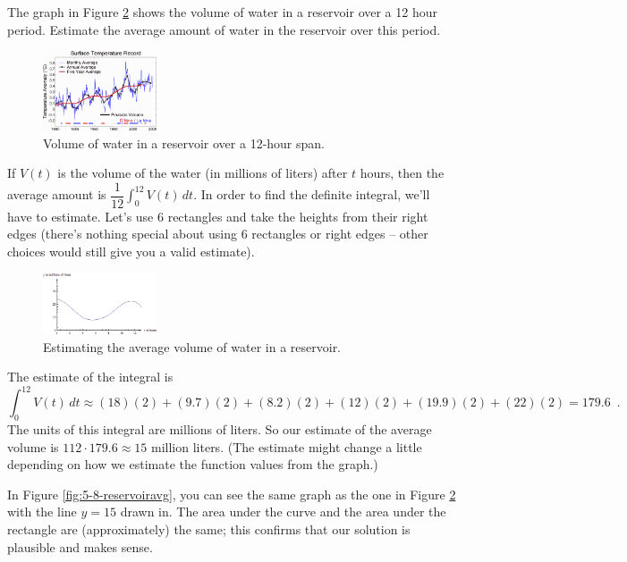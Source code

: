 \begin{example}
The graph in Figure \ref{fig:5-8-reservoir} shows the volume of water in a reservoir over a 12 hour period. Estimate the average amount of water in the reservoir over this period.

\begin{figure}[!ht]
  \centering
    \includegraphics[width=0.3\textwidth]{img/chap5/image054.png}
    \caption{Volume of water in a reservoir over a 12-hour span.}
    \label{fig:5-8-reservoir}
\end{figure}
\begin{solution}
If $V(t)$ is the volume of the water (in millions of liters) after $t$ hours, then the average amount is $\dfrac{1}{12}\int_0^{12}V(t)\,dt$. In order to find the definite integral, we'll have to estimate. Let's use 6 rectangles and take the heights from their right edges (there's nothing special about using 6 rectangles or right edges -- other choices would still give you a valid estimate).

\begin{figure}[!ht]
  \centering
    \includegraphics[width=0.3\textwidth]{img/chap5/image055.png}
    \caption{Estimating the average volume of water in a reservoir.}
    \label{fig:5-8-reservoir}
\end{figure}

The estimate of the integral is
$$\int_0^{12}V(t)\,dt\approx   (18)(2)+(9.7)(2)+(8.2)(2)+(12)(2)+(19.9)(2)+(22)(2)=179.6 \enspace .$$
The units of this integral are millions of liters. So our estimate of the average volume is $112\cdot 179.6 \approx 15$ million liters. (The estimate might change a little depending on how we estimate the function values from the graph.)

In Figure \ref{fig:5-8-reservoiravg}, you can see the same graph as the one in Figure \ref{fig:5-8-reservoir} with the line $y=15$ drawn in. The area under the curve and the area under the rectangle are (approximately) the same; this confirms that our solution is plausible and makes sense.


\end{solution}
\end{example}
